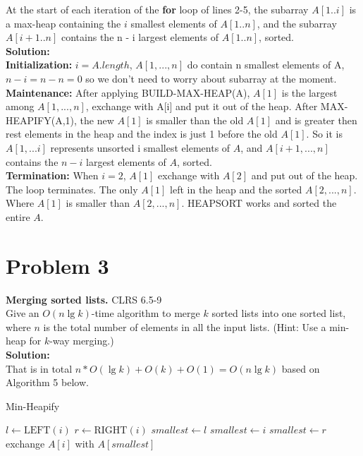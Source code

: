 \documentclass{article}
\begin{document}
At the start of each iteration of the \textbf{for} loop of lines 2-5, the subarray $A[1..i]$ is a max-heap containing the $i$ smallest elements of $A[1..n]$, and the subarray $A[i + 1..n]$ contains the n - i largest elements of $A[1..n]$, sorted.\\
\textbf{Solution:\\}
\textbf{Initialization:} $i = A.length$, $A[1,...,n]$ do contain n smallest elements of A, $n - i= n - n = 0$ so we don't need to worry about subarray at the moment.\\
\textbf{Maintenance:} After applying BUILD-MAX-HEAP(A), $A[1]$ is the largest among $A[1,...,n]$, exchange with A[i] and put it out of the heap. After MAX-HEAPIFY(A,1), the new $A[1]$ is smaller than the old $A[1]$ and is greater then rest elements in the heap and the index is just 1 before the old $A[1]$. So it is $A[1,...i]$ represents unsorted i smallest elements of $A$, and $A[i+1,...,n]$ contains the $n-i$ largest elements of $A$, sorted.\\
\textbf{Termination:} When $i=2$, $A[1]$ exchange with $A[2]$ and put out of the heap. The loop terminates. The only $A[1]$ left in the heap and the sorted $A[2,...,n]$. Where $A[1]$ is smaller than $A[2,...,n]$. HEAPSORT works and sorted the entire $A$.\\

\section*{Problem 3}
\textbf{Merging sorted lists.} CLRS 6.5-9\\
Give an \( O(n \lg k) \)-time algorithm to merge \( k \) sorted lists into one sorted list, where \( n \) is the total number of elements in all the input lists. (Hint: Use a min-heap for \( k \)-way merging.)\\
\textbf{Solution:\\}
That is in total $n * O(\lg k) + O(k) + O(1)=O(n \lg k)$ based on Algorithm 5 below.
\begin{algorithm}
\caption{Min-Heapify}
\begin{algorithmic}[1]
    \State $l \gets \text{LEFT}(i)$
    \State $r \gets \text{RIGHT}(i)$
        \State $smallest \gets l$
    \Else
        \State $smallest \gets i$
    \EndIf
        \State $smallest \gets r$
    \EndIf
        \State exchange $A[i]$ with $A[smallest]$
        \State {}
    \EndIf
\EndFunction {}
\end{algorithmic}
\end{algorithm}
\end{document}

